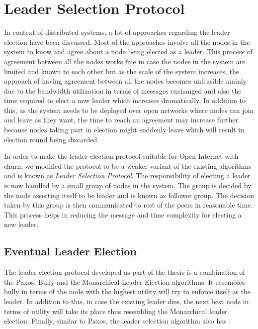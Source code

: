 \documentclass[a4paper,11pt]{kth-mag}
\begin{document}
\section{Leader Selection Protocol}
\label{ssec:leaderElection}


In context of distributed systems, a lot of approaches regarding the leader election have been discussed. Most of the approaches involve all the nodes in the system to know and agree about a node being elected as a leader. This process of agreement between all the nodes works fine in case the nodes in the system are limited and known to each other but as the scale of the system increases, the approach of having agreement between all the nodes becomes unfeasible mainly due to the bandwidth utilization in terms of messages exchanged and also the time required to elect a new leader which increases dramatically. In addition to this, as the system needs to be deployed over open networks where nodes can join and leave as they want, the time to reach an agreement may increase further because nodes taking part in election might suddenly leave which will result in election round being discarded.
\par In order to make the leader election protocol suitable for Open Internet with churn, we modified the protocol to be a weaker variant of the existing algorithms and is known as \textit{Leader Selection Protocol}. The responsibility of electing a leader is now handled by a small group of nodes in the system. The group is decided by the node asserting itself to be leader and is known as follower group. The decision taken by this group is then communicated to rest of the peers in reasonable time. This process helps in reducing the message and time complexity for electing a new leader.



\subsection{Eventual Leader Election}

The leader election protocol developed as part of the thesis is a combination of the Paxos\cite{lamportPaxos}, Bully\cite{bully} and the Monarchical Leader Election\cite{guerraoui} algorithms. It resembles bully in terms of the node with the highest utility will try to enforce itself as the leader. In addition to this, in case the existing leader dies, the next best node in terms of utility will take its place thus resembling the Monarchical leader election. Finally, similar to Paxos, the leader selection algorithm also has :
\end{document}

